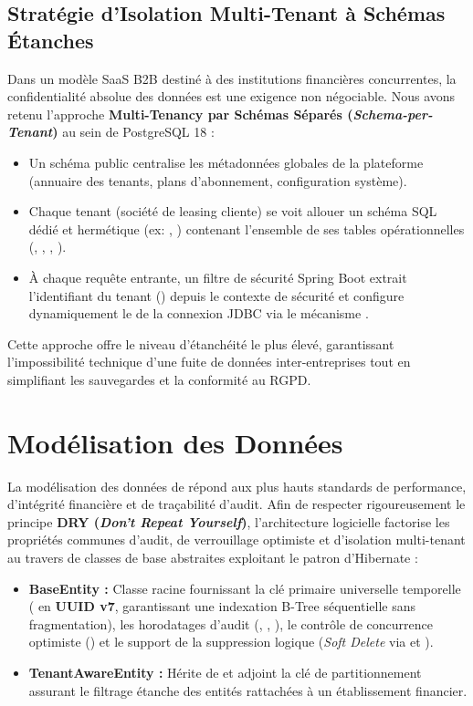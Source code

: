 \subsection{Stratégie d'Isolation Multi-Tenant à Schémas Étanches}

Dans un modèle SaaS B2B destiné à des institutions financières concurrentes, la confidentialité absolue des données est une exigence non négociable. Nous avons retenu l'approche \textbf{Multi-Tenancy par Schémas Séparés (\textit{Schema-per-Tenant})} au sein de PostgreSQL 18 :
\begin{itemize}
    \item Un schéma public  centralise les métadonnées globales de la plateforme (annuaire des tenants, plans d'abonnement, configuration système).
    \item Chaque tenant (société de leasing cliente) se voit allouer un schéma SQL dédié et hermétique (ex: , ) contenant l'ensemble de ses tables opérationnelles (, , , ).
    \item À chaque requête entrante, un filtre de sécurité Spring Boot extrait l'identifiant du tenant () depuis le contexte de sécurité et configure dynamiquement le  de la connexion JDBC via le mécanisme .
\end{itemize}

Cette approche offre le niveau d'étanchéité le plus élevé, garantissant l'impossibilité technique d'une fuite de données inter-entreprises tout en simplifiant les sauvegardes et la conformité au RGPD.

\section{Modélisation des Données}

La modélisation des données de \textbf{\projectShortTitle} répond aux plus hauts standards de performance, d'intégrité financière et de traçabilité d'audit. Afin de respecter rigoureusement le principe \textbf{DRY (\textit{Don't Repeat Yourself})}, l'architecture logicielle factorise les propriétés communes d'audit, de verrouillage optimiste et d'isolation multi-tenant au travers de classes de base abstraites exploitant le patron  d'Hibernate :
\begin{itemize}
    \item \textbf{BaseEntity :} Classe racine fournissant la clé primaire universelle temporelle ( en \textbf{UUID v7}, garantissant une indexation B-Tree séquentielle sans fragmentation), les horodatages d'audit (, , ), le contrôle de concurrence optimiste () et le support de la suppression logique (\textit{Soft Delete} via  et ).
    \item \textbf{TenantAwareEntity :} Hérite de  et adjoint la clé de partitionnement  assurant le filtrage étanche des entités rattachées à un établissement financier.
\end{itemize}

